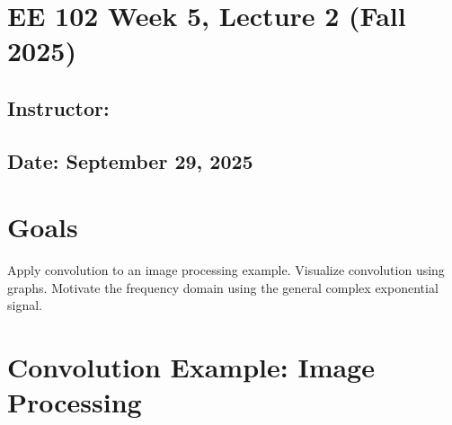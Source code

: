 \documentclass{ee102_notes}
\renewcommand{\releasedate}{September 29, 2025}
\begin{document}
\section*{EE 102 Week 5, Lecture 2 (Fall 2025)}
\subsection*{Instructor: \instructor}
\subsection*{Date: \releasedate}

\section{Goals}
Apply convolution to an image processing example.
Visualize convolution using graphs.
Motivate the frequency domain using the general complex exponential signal.
\section{Convolution Example: Image Processing}
 
\end{document}
